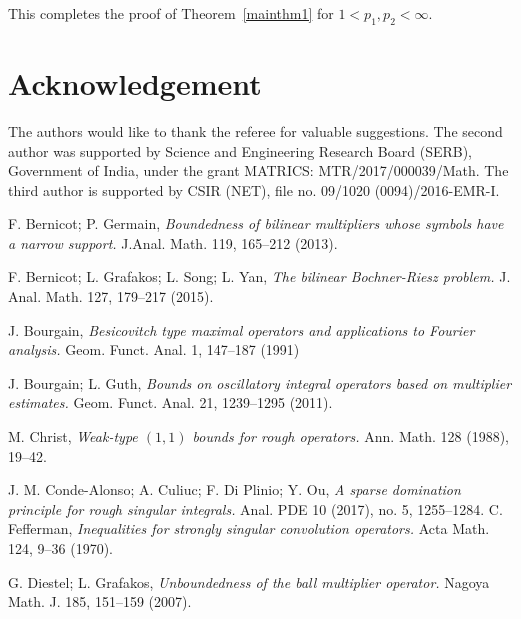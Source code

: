 \documentclass[a4paper,12pt]{amsart}
\begin{document}
This completes the proof of Theorem~\ref{mainthm1} for $1<p_{1},p_{2}<\infty$. 

\section*{Acknowledgement} The authors would like to thank the referee for valuable suggestions. The second author was supported by Science and Engineering Research Board (SERB), Government of India, under the grant MATRICS: MTR/2017/000039/Math. The third  author is supported by CSIR (NET), file no. 09/1020 (0094)/2016-EMR-I. 


\begin{thebibliography}{99}
 F. Bernicot; P. Germain, {\it Boundedness of bilinear multipliers whose symbols have a narrow support.}  J.Anal. Math. 119, 165--212 (2013).

 F. Bernicot; L. Grafakos; L. Song; L. Yan, {\it The bilinear Bochner-Riesz problem.} J. Anal. Math. 127, 179--217 (2015). 
 
 J. Bourgain,  {\it Besicovitch type maximal operators and applications to Fourier analysis.} Geom. Funct. Anal. 1, 147--187 (1991)

 J. Bourgain; L. Guth,  {\it Bounds on oscillatory integral operators based on multiplier estimates.} Geom. Funct. Anal. 21, 1239--1295 (2011).


 M. Christ, {\it Weak-type $(1,1)$ bounds for rough operators.} Ann. Math. 128 (1988), 19--42.

 J. M. Conde-Alonso; A. Culiuc; F. Di Plinio; Y. Ou, {\it A sparse domination principle for rough singular integrals.} Anal. PDE 10 (2017), no. 5, 1255--1284. 
 C. Fefferman, {\it Inequalities for strongly singular convolution operators.} Acta Math. 124, 9--36 (1970).

 G. Diestel; L. Grafakos, {\it  Unboundedness of the ball multiplier operator.} Nagoya  Math. J. 185, 151--159 (2007).


\end{thebibliography}
\end{document}
